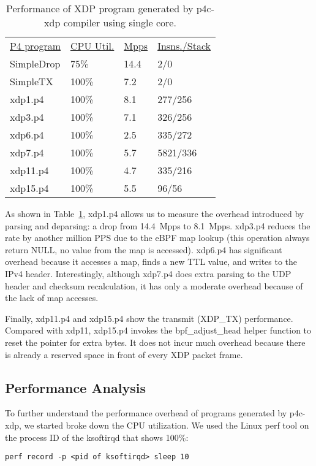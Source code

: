 \begin{table}
\centering
\small
\begin{tabular}{llll}
  \underline{P4 program} & \underline{CPU Util.} & \underline{Mpps} & \underline{Insns./Stack}\\
  SimpleDrop & 75\% & 14.4 & 2/0 \\
  SimpleTX & 100\% & 7.2 & 2/0 \\
  xdp1.p4 &  100\% &  8.1 & 277/256 \\
  xdp3.p4 &  100\% &  7.1 & 326/256 \\
  xdp6.p4 &  100\% &  2.5 & 335/272 \\
  xdp7.p4 &  100\% &  5.7 & 5821/336 \\
  xdp11.p4 &  100\% &  4.7  & 335/216 \\
  xdp15.p4 &  100\% &  5.5 & 96/56\\
\end{tabular}
\caption{\footnotesize Performance of XDP program generated by
  p4c-xdp compiler using single core.}
\label{tab:perf}
\end{table}

As shown in Table~\ref{tab:perf}, xdp1.p4 allows us to measure the
overhead introduced by parsing and deparsing: a drop from 14.4~Mpps to
8.1~Mpps.  xdp3.p4 reduces the rate by another million PPS due to the
eBPF map lookup (this operation always return NULL, no value from the
map is accessed).  xdp6.p4 has significant overhead because it
accesses a map, finds a new TTL value, and writes to the IPv4 header.
Interestingly, although xdp7.p4 does extra parsing to the UDP header
and checksum recalculation, it has only a moderate overhead because of
the lack of map accesses.

Finally, xdp11.p4 and xdp15.p4 show the transmit (XDP\_TX)
performance.  Compared with xdp11, xdp15.p4 invokes the
bpf\_adjust\_head helper function to reset the pointer for extra
bytes.  It does not incur much overhead because there
is already a reserved space in front of every XDP packet frame.

\subsection{Performance Analysis}

To further understand the performance overhead of programs generated
by p4c-xdp, we started broke down the CPU utilization. We used the Linux
perf tool on the process ID of the ksoftirqd that shows 100\%:
\begin{lstlisting}[frame=none]
perf record -p <pid of ksoftirqd> sleep 10
\end{lstlisting}


